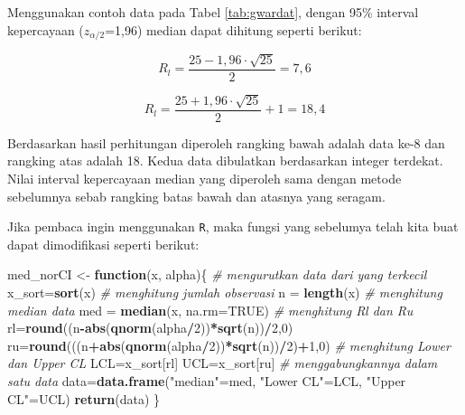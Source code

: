 \documentclass[]{book}
\newenvironment{Shaded}{\begin{snugshade}}{\end{snugshade}}
\newcommand{\KeywordTok}[1]{\textcolor[rgb]{0.13,0.29,0.53}{\textbf{#1}}}
\newcommand{\DataTypeTok}[1]{\textcolor[rgb]{0.13,0.29,0.53}{#1}}
\newcommand{\DecValTok}[1]{\textcolor[rgb]{0.00,0.00,0.81}{#1}}
\newcommand{\StringTok}[1]{\textcolor[rgb]{0.31,0.60,0.02}{#1}}
\newcommand{\CommentTok}[1]{\textcolor[rgb]{0.56,0.35,0.01}{\textit{#1}}}
\newcommand{\OtherTok}[1]{\textcolor[rgb]{0.56,0.35,0.01}{#1}}
\newcommand{\ControlFlowTok}[1]{\textcolor[rgb]{0.13,0.29,0.53}{\textbf{#1}}}
\newcommand{\OperatorTok}[1]{\textcolor[rgb]{0.81,0.36,0.00}{\textbf{#1}}}
\newcommand{\NormalTok}[1]{#1}
\begin{document}
Menggunakan contoh data pada Tabel \ref{tab:gwardat}, dengan 95\%
interval kepercayaan (\(z_{\alpha/2}\)=1,96) median dapat dihitung
seperti berikut:

\[
  R_l=\frac{25-1,96\cdot\sqrt{25}}{2}=7,6 
\]

\[
  R_l=\frac{25+1,96\cdot\sqrt{25}}{2}+1=18,4 
\]

Berdasarkan hasil perhitungan diperoleh rangking bawah adalah data ke-8
dan rangking atas adalah 18. Kedua data dibulatkan berdasarkan integer
terdekat. Nilai interval kepercayaan median yang diperoleh sama dengan
metode sebelumnya sebab rangking batas bawah dan atasnya yang seragam.

Jika pembaca ingin menggunakan \texttt{R}, maka fungsi yang sebelumya
telah kita buat dapat dimodifikasi seperti berikut:

\begin{Shaded}
\begin{Highlighting}[]
\NormalTok{med_norCI <-}\StringTok{ }\ControlFlowTok{function}\NormalTok{(x, alpha)\{}
  \CommentTok{# mengurutkan data dari yang terkecil}
\NormalTok{  x_sort=}\KeywordTok{sort}\NormalTok{(x)}
  \CommentTok{# menghitung jumlah observasi}
\NormalTok{  n =}\StringTok{ }\KeywordTok{length}\NormalTok{(x)}
  \CommentTok{# menghitung median data}
\NormalTok{  med =}\StringTok{ }\KeywordTok{median}\NormalTok{(x, }\DataTypeTok{na.rm=}\OtherTok{TRUE}\NormalTok{)}
  \CommentTok{# menghitung Rl dan Ru}
\NormalTok{  rl=}\KeywordTok{round}\NormalTok{((n}\OperatorTok{-}\KeywordTok{abs}\NormalTok{(}\KeywordTok{qnorm}\NormalTok{(alpha}\OperatorTok{/}\DecValTok{2}\NormalTok{))}\OperatorTok{*}\KeywordTok{sqrt}\NormalTok{(n))}\OperatorTok{/}\DecValTok{2}\NormalTok{,}\DecValTok{0}\NormalTok{)}
\NormalTok{  ru=}\KeywordTok{round}\NormalTok{(((n}\OperatorTok{+}\KeywordTok{abs}\NormalTok{(}\KeywordTok{qnorm}\NormalTok{(alpha}\OperatorTok{/}\DecValTok{2}\NormalTok{))}\OperatorTok{*}\KeywordTok{sqrt}\NormalTok{(n))}\OperatorTok{/}\DecValTok{2}\NormalTok{)}\OperatorTok{+}\DecValTok{1}\NormalTok{,}\DecValTok{0}\NormalTok{)}
  \CommentTok{# menghitung Lower dan Upper CL}
\NormalTok{  LCL=x_sort[rl]}
\NormalTok{  UCL=x_sort[ru]}
  \CommentTok{# menggabungkannya dalam satu data}
\NormalTok{  data=}\KeywordTok{data.frame}\NormalTok{(}\StringTok{"median"}\NormalTok{=med,}
                  \StringTok{"Lower CL"}\NormalTok{=LCL,}
                  \StringTok{"Upper CL"}\NormalTok{=UCL)}
  \KeywordTok{return}\NormalTok{(data)}
\NormalTok{\}}
\end{Highlighting}
\end{Shaded}
\end{document}

